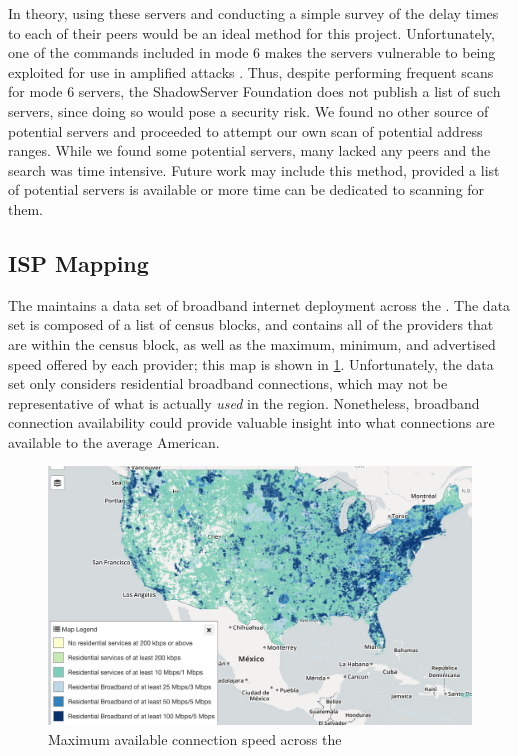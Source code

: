 In theory, using these servers and conducting a simple survey of the delay times to each of their peers would be an ideal method for this project. Unfortunately, one of the commands included in mode 6 makes the servers vulnerable to being exploited for use in amplified \ddos attacks \cite{USDepartmentofHomelandSecurity2014NTPCVE-2013-5211}. Thus, despite performing frequent scans for mode 6 servers, the ShadowServer Foundation does not publish a list of such servers, since doing so would pose a security risk. We found no other source of potential servers and proceeded to attempt our own scan of potential \ip address ranges. While we found some potential servers, many lacked any peers and the search was time intensive. Future work may include this method, provided a list of potential servers is available or more time can be dedicated to scanning for them.

\subsection{ISP Mapping}
The \FCC maintains a data set of broadband internet deployment across the \us \cite{FederalCommunicationsCommission}. The data set is composed of a list of census blocks, and contains all of the providers that are within the census block, as well as the maximum, minimum, and advertised speed offered by each provider; this map is shown in \cref{fig:broadband_map}. Unfortunately, the data set only considers residential broadband connections, which may not be representative of what is actually \textit{used} in the region. Nonetheless, broadband connection availability could provide valuable insight into what connections are available to the average American.

\begin{figure}
    \centering
    \includegraphics{images/other/FCC_Fixed_Broadmand_map.png}
    \caption{Maximum available connection speed across the \us}
    \label{fig:broadband_map}
\end{figure}

